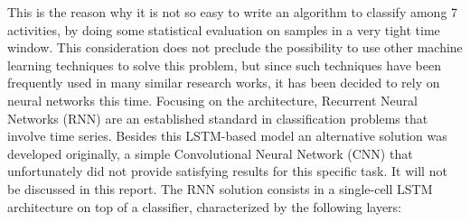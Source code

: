 This is the reason why it is not so easy to write an algorithm to classify among 7 activities, by doing some statistical evaluation on samples in a very tight time window. This consideration does not preclude the possibility to use other machine learning techniques to solve this problem, but since such techniques have been frequently used in many similar research works, it has been decided to rely on neural networks this time.\newline
Focusing on the architecture, Recurrent Neural Networks (RNN) are an established standard in classification problems that involve time series. Besides this LSTM-based model  an alternative solution was developed originally, a simple Convolutional Neural Network (CNN) that  unfortunately did not provide satisfying results for this specific task. It will not be discussed in this report.\newline
The RNN solution consists in a single-cell LSTM architecture on top of a classifier, characterized by the following layers:


